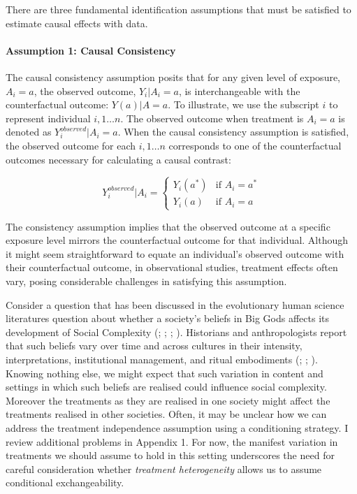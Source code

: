 \documentclass[
  singlecolumn,
  9pt]{article}
\let\oldparagraph\paragraph
\renewcommand{\paragraph}[1]{\oldparagraph{#1}\mbox{}}
\begin{document}
There are three fundamental identification assumptions that must be
satisfied to estimate causal effects with data.

\paragraph{Assumption 1: Causal
Consistency}\label{assumption-1-causal-consistency}

The causal consistency assumption posits that for any given level of
exposure, \(A_i=a\), the observed outcome, \(Y_i|A_i=a\), is
interchangeable with the counterfactual outcome: \(Y(a)|A = a\). To
illustrate, we use the subscript \(i\) to represent individual
\(i, 1 \dots n\). The observed outcome when treatment is \(A_i = a\) is
denoted as \(Y_i^{observed}|A_i = a\). When the causal consistency
assumption is satisfied, the observed outcome for each \(i, 1 \dots n\)
corresponds to one of the counterfactual outcomes necessary for
calculating a causal contrast:

\[
Y_i^{observed}|A_i = 
\begin{cases} 
Y_i(a^*) & \text{if } A_i = a^* \\
Y_i(a) & \text{if } A_i = a
\end{cases}
\]

The consistency assumption implies that the observed outcome at a
specific exposure level mirrors the counterfactual outcome for that
individual. Although it might seem straightforward to equate an
individual's observed outcome with their counterfactual outcome, in
observational studies, treatment effects often vary, posing considerable
challenges in satisfying this assumption.

Consider a question that has been discussed in the evolutionary human
science literatures question about whether a society's beliefs in Big
Gods affects its development of Social Complexity
(;
;
;
).
Historians and anthropologists report that such beliefs vary over time
and across cultures in their intensity, interpretations, institutional
management, and ritual embodiments (; ;
). Knowing nothing else, we
might expect that such variation in content and settings in which such
beliefs are realised could influence social complexity. Moreover the
treatments as they are realised in one society might affect the
treatments realised in other societies. Often, it may be unclear how we
can address the treatment independence assumption using a conditioning
strategy. I review additional problems in Appendix 1. For now, the
manifest variation in treatments we should assume to hold in this
setting underscores the need for careful consideration whether
\emph{treatment heterogeneity} allows us to assume conditional
exchangeability.
\end{document}
